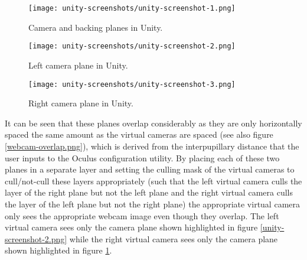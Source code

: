 \begin{figure}[h]
    \begin{center}
    \begin{minipage}[t]{.32\textwidth}
        \begin{center}
        \texttt{[image: unity-screenshots/unity-screenshot-1.png]}
        \caption{Camera and backing planes in Unity.}
        \label{unity-screenshot-1.png}
        \end{center}
    \end{minipage}%
    \hspace{.01\textwidth}
    \begin{minipage}[t]{.32\textwidth}
		\begin{center}
        \texttt{[image: unity-screenshots/unity-screenshot-2.png]}
        \caption{Left camera plane in Unity.}
        \label{unity-screenshot-2.png}
        \end{center}
    \end{minipage}%
    \hspace{.01\textwidth}
    \begin{minipage}[t]{.32\textwidth}
        \begin{center}
        \texttt{[image: unity-screenshots/unity-screenshot-3.png]}
        \caption{Right camera plane in Unity.}
        \label{unity-screenshot-3.png}
        \end{center}
    \end{minipage}
    \end{center}
\end{figure}

It can be seen that these planes overlap considerably as they are only horizontally spaced the same amount as the virtual cameras are spaced (see also figure \ref{webcam-overlap.png}), which is derived from the interpupillary distance that the user inputs to the Oculus configuration utility. By placing each of these two planes in a separate layer and setting the culling mask of the virtual cameras to cull/not-cull these layers appropriately (such that the left virtual camera culls the layer of the right plane but not the left plane and the right virtual camera culls the layer of the left plane but not the right plane) the appropriate virtual camera only sees the appropriate webcam image even though they overlap. The left virtual camera sees only the camera plane shown highlighted in figure \ref{unity-screenshot-2.png} while the right virtual camera sees only the camera plane shown highlighted in figure \ref{unity-screenshot-3.png}.

